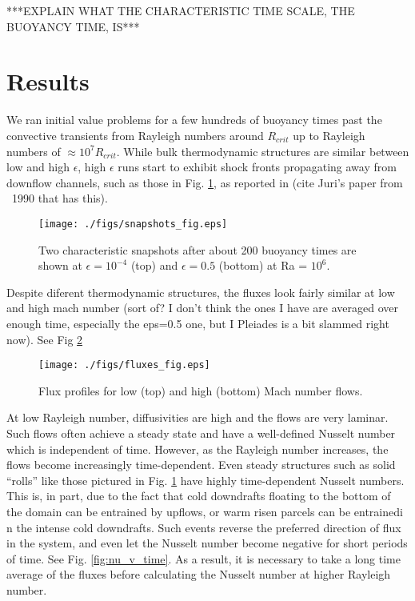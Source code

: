 \documentclass[aps, prl, twocolumn, groupedaddress]{revtex4-1}
\begin{document}
***EXPLAIN WHAT THE CHARACTERISTIC TIME SCALE, THE BUOYANCY TIME, IS***


\section{Results \label{section:results}}
We ran initial value problems for a few hundreds of buoyancy times past the convective transients from 
Rayleigh numbers around $R_{crit}$ up to Rayleigh numbers of $\approx 10^7 R_{crit}$.  While bulk thermodynamic
structures are similar between low and high $\epsilon$, high $\epsilon$ runs start to exhibit shock fronts
propagating away from downflow channels, such as those in Fig. \ref{fig:entropy_snapshots}, as reported in
(cite Juri's paper from ~1990 that has this).
\begin{figure}[t]
\texttt{[image: ./figs/snapshots\_fig.eps]}
\caption{Two characteristic snapshots after about 200 buoyancy times are shown at $\epsilon=10^{-4}$ (top)
and $\epsilon=0.5$ (bottom) at Ra = $10^6$.  
\label{fig:entropy_snapshots} }
\end{figure}

Despite diferent thermodynamic structures, the fluxes look fairly similar at low and high mach number (sort of?
I don't think the ones I have are averaged over enough time, especially the eps=0.5 one, but I Pleiades is
a bit slammed right now).  See Fig \ref{fig:flux_profiles}

\begin{figure}[b]
\texttt{[image: ./figs/fluxes\_fig.eps]}
\caption{Flux profiles for low (top) and high (bottom) Mach number flows.  
\label{fig:flux_profiles} }
\end{figure}

At low Rayleigh number, diffusivities are high and the flows are very laminar.  Such flows often achieve a
steady state and have a well-defined Nusselt number which is independent of time.  However, as the Rayleigh
number increases, the flows become increasingly time-dependent.  Even steady structures such as solid
``rolls'' like those pictured in Fig. \ref{fig:entropy_snapshots} have highly time-dependent Nusselt numbers.
This is, in part, due to the fact that cold downdrafts floating to the bottom of the domain can be entrained
by upflows, or warm risen parcels can be entrainedi n the intense cold downdrafts.  Such events reverse the
preferred direction of flux in the system, and even let the Nusselt number become negative for short periods of
time.  See Fig. \ref{fig:nu_v_time}.  As a result, it is necessary to take a long time average of the fluxes
before calculating the Nusselt number at higher Rayleigh number.
\end{document}

